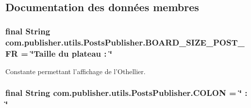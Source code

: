 \subsection{Documentation des données membres}
\hypertarget{interfacecom_1_1publisher_1_1utils_1_1PostsPublisher_ac6b756c7ba49be88819412b11cd46455}{
\subsubsection[{B\-O\-A\-R\-D\-\_\-\-S\-I\-Z\-E\-\_\-\-P\-O\-S\-T\-\_\-\-F\-R}]{\setlength{\rightskip}{0pt plus 5cm}final String com.\-publisher.\-utils.\-Posts\-Publisher.\-B\-O\-A\-R\-D\-\_\-\-S\-I\-Z\-E\-\_\-\-P\-O\-S\-T\-\_\-\-F\-R = \char`\"{}Taille du plateau \-: \char`\"{}\hspace{0.3cm}{\ttfamily [static]}}}\label{interfacecom_1_1publisher_1_1utils_1_1PostsPublisher_ac6b756c7ba49be88819412b11cd46455}
Constante permettant l'affichage de l'Othellier. \hypertarget{interfacecom_1_1publisher_1_1utils_1_1PostsPublisher_a9ae26b0ce9e748867d3bda72a4686224}{
\subsubsection[{C\-O\-L\-O\-N}]{\setlength{\rightskip}{0pt plus 5cm}final String com.\-publisher.\-utils.\-Posts\-Publisher.\-C\-O\-L\-O\-N = \char`\"{} \-: \char`\"{}\hspace{0.3cm}{\ttfamily [static]}}}\label{interfacecom_1_1publisher_1_1utils_1_1PostsPublisher_a9ae26b0ce9e748867d3bda72a4686224}
